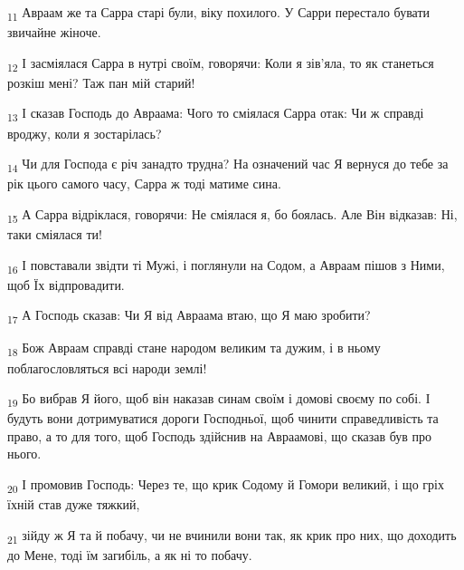 \begin{tcolorbox}
\textsubscript{11} Авраам же та Сарра старі були, віку похилого. У Сарри перестало бувати звичайне жіноче.
\end{tcolorbox}
\begin{tcolorbox}
\textsubscript{12} І засміялася Сарра в нутрі своїм, говорячи: Коли я зів'яла, то як станеться розкіш мені? Таж пан мій старий!
\end{tcolorbox}
\begin{tcolorbox}
\textsubscript{13} І сказав Господь до Авраама: Чого то сміялася Сарра отак: Чи ж справді вроджу, коли я зостарілась?
\end{tcolorbox}
\begin{tcolorbox}
\textsubscript{14} Чи для Господа є річ занадто трудна? На означений час Я вернуся до тебе за рік цього самого часу, Сарра ж тоді матиме сина.
\end{tcolorbox}
\begin{tcolorbox}
\textsubscript{15} А Сарра відріклася, говорячи: Не сміялася я, бо боялась. Але Він відказав: Ні, таки сміялася ти!
\end{tcolorbox}
\begin{tcolorbox}
\textsubscript{16} І повставали звідти ті Мужі, і поглянули на Содом, а Авраам пішов з Ними, щоб Їх відпровадити.
\end{tcolorbox}
\begin{tcolorbox}
\textsubscript{17} А Господь сказав: Чи Я від Авраама втаю, що Я маю зробити?
\end{tcolorbox}
\begin{tcolorbox}
\textsubscript{18} Бож Авраам справді стане народом великим та дужим, і в ньому поблагословляться всі народи землі!
\end{tcolorbox}
\begin{tcolorbox}
\textsubscript{19} Бо вибрав Я його, щоб він наказав синам своїм і домові своєму по собі. І будуть вони дотримуватися дороги Господньої, щоб чинити справедливість та право, а то для того, щоб Господь здійснив на Авраамові, що сказав був про нього.
\end{tcolorbox}
\begin{tcolorbox}
\textsubscript{20} І промовив Господь: Через те, що крик Содому й Гомори великий, і що гріх їхній став дуже тяжкий,
\end{tcolorbox}
\begin{tcolorbox}
\textsubscript{21} зійду ж Я та й побачу, чи не вчинили вони так, як крик про них, що доходить до Мене, тоді їм загибіль, а як ні то побачу.
\end{tcolorbox}
